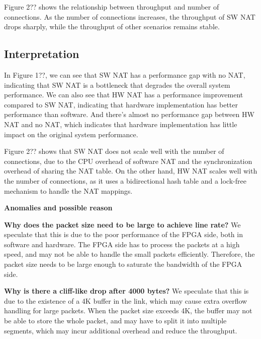 Figure 2?? shows the relationship between throughput and number of connections. As the number of connections increases, the throughput of SW NAT drops sharply, while the throughput of other scenarios remains stable. 

\subsection{Interpretation}

In Figure 1??, we can see that SW NAT has a performance gap with no NAT, indicating that SW NAT is a bottleneck that degrades the overall system performance. We can also see that HW NAT has a performance improvement compared to SW NAT, indicating that hardware implementation has better performance than software. And there's almost no performance gap between HW NAT and no NAT, which indicates that hardware implementation has little impact on the original system performance.

Figure 2?? shows that SW NAT does not scale well with the number of connections, due to the CPU overhead of software NAT and the synchronization overhead of sharing the NAT table. On the other hand, HW NAT scales well with the number of connections, as it uses a bidirectional hash table and a lock-free mechanism to handle the NAT mappings.

\textbf{Anomalies and possible reason}

\textbf{Why does the packet size need to be large to achieve line rate?} We speculate that this is due to the poor performance of the FPGA side, both in software and hardware. The FPGA side has to process the packets at a high speed, and may not be able to handle the small packets efficiently. Therefore, the packet size needs to be large enough to saturate the bandwidth of the FPGA side.

\textbf{Why is there a cliff-like drop after 4000 bytes?} We speculate that this is due to the existence of a 4K buffer in the link, which may cause extra overflow handling for large packets. When the packet size exceeds 4K, the buffer may not be able to store the whole packet, and may have to split it into multiple segments, which may incur additional overhead and reduce the throughput.
